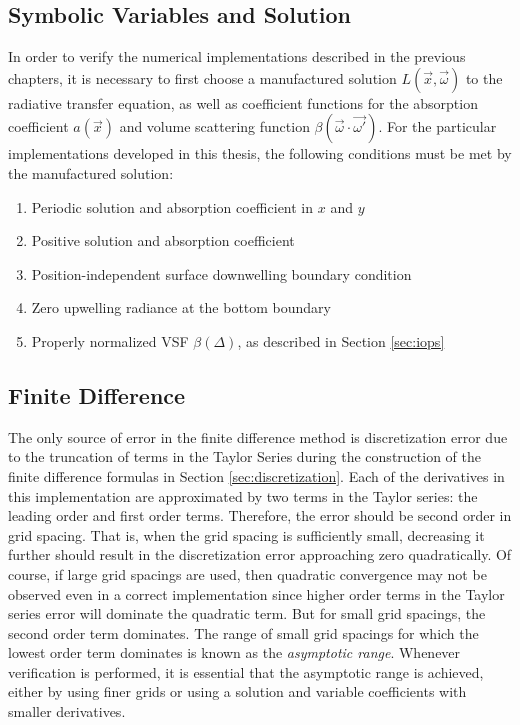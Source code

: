 \subsection{Symbolic Variables and Solution}
In order to verify the numerical implementations described in the previous chapters, it is necessary to first choose a manufactured solution $L(\vec{x}, \vec{\omega})$ to the radiative transfer equation, as well as coefficient functions for the absorption coefficient $a(\vec{x})$ and volume scattering function $\beta(\vec{\omega}\cdot\vec{\omega'})$.
For the particular implementations developed in this thesis, the following conditions must be met by the manufactured solution:
\begin{enumerate}
  \item Periodic solution and absorption coefficient in $x$ and $y$
  \item Positive solution and absorption coefficient
  \item Position-independent surface downwelling boundary condition
  \item Zero upwelling radiance at the bottom boundary
  \item Properly normalized VSF $\beta(\Delta)$, as described in Section \ref{sec:iops}
\end{enumerate}


\subsection{Finite Difference}

The only source of error in the finite difference method is discretization error due to the truncation of terms in the Taylor Series during the construction of the finite difference formulas in Section \ref{sec:discretization}.
Each of the derivatives in this implementation are approximated by two terms in the Taylor series: the leading order and first order terms.
Therefore, the error should be second order in grid spacing.
That is, when the grid spacing is sufficiently small, decreasing it further should result in the discretization error approaching zero quadratically.
Of course, if large grid spacings are used, then quadratic convergence may not be observed even in a correct implementation since higher order terms in the Taylor series error will dominate the quadratic term.
But for small grid spacings, the second order term dominates.
The range of small grid spacings for which the lowest order term dominates is known as the \textit{asymptotic range}.
Whenever verification is performed, it is essential that the asymptotic range is achieved, either by using finer grids or using a solution and variable coefficients with smaller derivatives.

